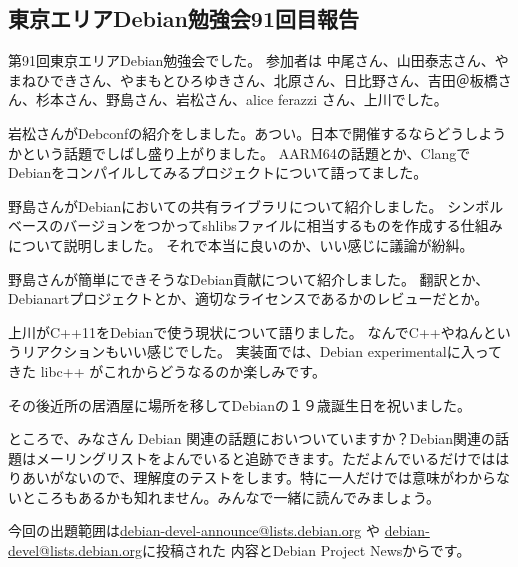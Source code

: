 \documentclass[mingoth,a4paper]{jsarticle}
\begin{document}
\subsection{東京エリアDebian勉強会91回目報告}


第91回東京エリアDebian勉強会でした。
参加者は
中尾さん、山田泰志さん、やまねひできさん、やまもとひろゆきさん、北原さん、日比野さん、吉田＠板橋さん、杉本さん、野島さん、岩松さん、alice ferazzi さん、上川でした。

岩松さんがDebconfの紹介をしました。あつい。日本で開催するならどうしようかという話題でしばし盛り上がりました。
AARM64の話題とか、ClangでDebianをコンパイルしてみるプロジェクトについて語ってました。

野島さんがDebianにおいての共有ライブラリについて紹介しました。
シンボルベースのバージョンをつかってshlibsファイルに相当するものを作成する仕組みについて説明しました。
それで本当に良いのか、いい感じに議論が紛糾。	    

野島さんが簡単にできそうなDebian貢献について紹介しました。
翻訳とか、Debianartプロジェクトとか、適切なライセンスであるかのレビューだとか。

上川がC++11をDebianで使う現状について語りました。
なんでC++やねんというリアクションもいい感じでした。
実装面では、Debian experimentalに入ってきた libc++ がこれからどうなるのか楽しみです。

その後近所の居酒屋に場所を移してDebianの１９歳誕生日を祝いました。



ところで、みなさん Debian 関連の話題においついていますか？Debian関連の話
題はメーリングリストをよんでいると追跡できます。ただよんでいるだけではは
りあいがないので、理解度のテストをします。特に一人だけでは意味がわからな
いところもあるかも知れません。みんなで一緒に読んでみましょう。

今回の出題範囲は\url{debian-devel-announce@lists.debian.org} や \url{debian-devel@lists.debian.org}に投稿された
内容とDebian Project Newsからです。

\begin{multicols}{2}

\end{multicols}

\end{document}

